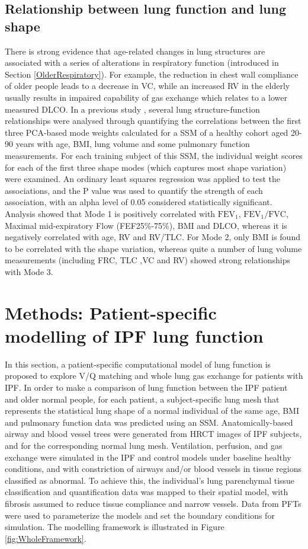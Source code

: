 \subsection{Relationship between lung function and lung shape}
There is strong evidence that age-related changes in lung structures are associated with a series of alterations in respiratory function (introduced in Section \ref{OlderRespiratory}). For example, the reduction in chest wall compliance of older people leads to a decrease in VC, while an increased RV in the elderly usually results in impaired capability of gas exchange which relates to a lower measured DLCO. In a previous study \citep{Osanlouy2018Statistical}, several lung structure-function relationships were analysed through quantifying the correlations between the first three PCA-based mode weights calculated for a SSM of a healthy cohort aged 20-90 years with age, BMI, lung volume and some pulmonary function measurements. For each training subject of this SSM, the individual weight scores for each of the first three shape modes (which captures most shape variation) were examined. An ordinary least squares regression was applied to test the associations, and the P value was used to quantify the strength of each association, with an alpha level of 0.05 considered statistically significant. Analysis showed that Mode 1 is positively correlated with $\mathrm{FEV_1}$, $\mathrm{FEV_1/FVC}$, Maximal mid-expiratory Flow (FEF25\%-75\%), BMI and DLCO, whereas it is negatively correlated with age, RV and RV/TLC. For Mode 2, only BMI is found to be correlated with the shape variation, whereas quite a number of lung volume measurements (including FRC, TLC ,VC and RV) showed strong relationships with Mode 3.

\section{Methods: Patient-specific modelling of IPF lung function}
In this section, a patient-specific computational model of lung function is proposed to explore V/Q matching and whole lung gas exchange for patients with IPF. In order to make a comparison of lung function between the IPF patient and older normal people, for each patient, a subject-specific lung mesh that represents the statistical lung shape of a normal individual of the same age, BMI and pulmonary function data was predicted using an SSM. Anatomically-based airway and blood vessel trees were generated from HRCT images of IPF subjects, and for the corresponding normal lung mesh. Ventilation, perfusion, and gas exchange were simulated in the IPF and control models under baseline healthy conditions, and with constriction of airways and/or blood vessels in tissue regions classified as abnormal. To achieve this, the individual's lung parenchymal tissue classification and quantification data was mapped to their spatial model, with fibrosis assumed to reduce tissue compliance and narrow vessels. Data from PFTs were used to parameterize the models and set the boundary conditions for simulation. The modelling framework is illustrated in Figure \ref{fig:WholeFramework}. 

